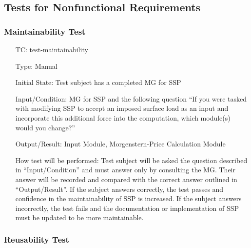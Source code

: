 \documentclass[12pt, titlepage]{article}
\newcounter{testnum} %
\newcommand{\progname}{SSP}
\begin{document}
\subsection{Tests for Nonfunctional Requirements} \label{sec_NFRTests}

\subsubsection{Maintainability Test} \label{sec_Maintainability}

\begin{enumerate}[label=TC\arabic*:,ref={\arabic*}]
	
\item [TC\refstepcounter{testnum}\thetestnum: \label{TC_Maintainability}] 
test-maintainability

Type: Manual
					
Initial State: Test subject has a completed MG for \progname{}
					
Input/Condition: MG for \progname{} and the following question ``If you were 
tasked with modifying \progname{} to accept an imposed surface load as an input 
and incorporate this additional force into the computation, which module(s) 
would you change?''
					
Output/Result: Input Module, Morgenstern-Price Calculation Module
					
How test will be performed: Test subject will be asked the question described 
in ``Input/Condition'' and must answer only by consulting the MG. Their answer 
will be recorded and compared with the correct answer outlined in 
``Output/Result''. If the subject answers correctly, the test passes and 
confidence in the maintainability of \progname{} is increased. If the subject 
answers incorrectly, the test fails and the documentation or implementation of 
\progname{} must be updated to be more maintainable.
					
\end{enumerate}


\subsubsection{Reusability Test} \label{sec_Reusability}
\end{document}
